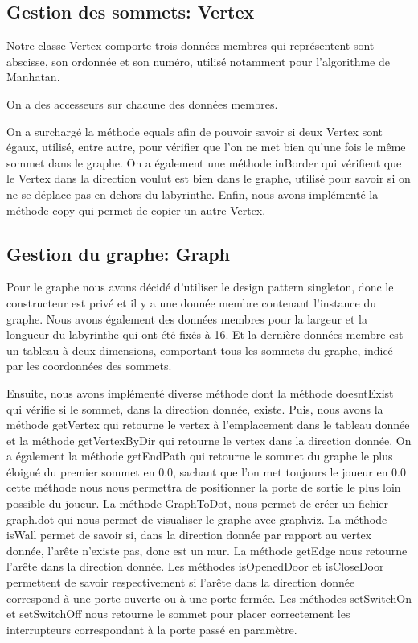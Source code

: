 \documentclass [10pt, a4paper]{article}
\begin{document}
\subsection {Gestion des sommets: Vertex}
Notre classe Vertex comporte trois données membres qui représentent sont abscisse, son ordonnée et son numéro, utilisé notamment pour l'algorithme de Manhatan.

On a des accesseurs sur chacune des données membres.

On a surchargé la méthode equals afin de pouvoir savoir si deux Vertex sont égaux, utilisé, entre autre, pour vérifier que l'on ne met bien qu'une fois le même sommet dans le graphe. On a également une méthode inBorder qui vérifient que le Vertex dans la direction voulut est bien dans le graphe, utilisé pour savoir si on ne se déplace pas en dehors du labyrinthe. Enfin, nous avons implémenté la méthode copy qui permet de copier un autre Vertex.

\subsection {Gestion du graphe: Graph}
Pour le graphe nous avons décidé d'utiliser le design pattern singleton, donc le constructeur est privé et il y a une donnée membre contenant l'instance du graphe. Nous avons également des données membres pour la largeur et la longueur du labyrinthe qui ont été fixés à 16. Et la dernière données membre est un tableau à deux dimensions, comportant tous les sommets du graphe, indicé par les coordonnées des sommets.

Ensuite, nous avons implémenté diverse méthode dont la méthode doesntExist qui vérifie si le sommet, dans la direction donnée, existe. Puis, nous avons la méthode getVertex qui retourne le vertex à l'emplacement dans le tableau donnée et la méthode getVertexByDir qui retourne le vertex dans la direction donnée. On a également la méthode getEndPath qui retourne le sommet du graphe le plus éloigné du premier sommet en 0.0, sachant que l'on met toujours le joueur en 0.0 cette méthode nous nous permettra de positionner la porte de sortie le plus loin possible du joueur. La méthode GraphToDot, nous permet de créer un fichier graph.dot qui nous permet de visualiser le graphe avec graphviz. La méthode isWall permet de savoir si, dans la direction donnée par rapport au vertex donnée, l'arête n'existe pas, donc est un mur. La méthode getEdge nous retourne l'arête dans la direction donnée. Les méthodes isOpenedDoor et isCloseDoor permettent de savoir respectivement si l'arête dans la direction donnée correspond à une porte ouverte ou à une porte fermée. Les méthodes setSwitchOn et setSwitchOff nous retourne le sommet pour placer correctement les interrupteurs correspondant à la porte passé en paramètre.
\end{document}
